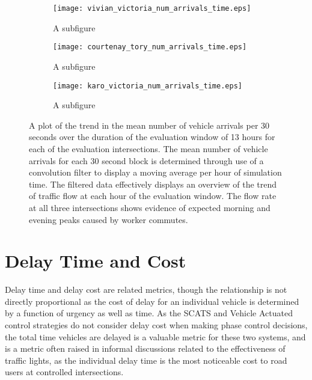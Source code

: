 {\begin{figure}
\centering
\begin{subfigure}{.5\textwidth}
  \centering
  \texttt{[image: vivian\_victoria\_num\_arrivals\_time.eps]}
  \caption{A subfigure}
  \label{vehiclearrivalstime:sub1}
\end{subfigure}%
\begin{subfigure}{.5\textwidth}
  \centering
  \texttt{[image: courtenay\_tory\_num\_arrivals\_time.eps]}
  \caption{A subfigure}
  \label{vehiclearrivalstime:sub2}
\end{subfigure}

\vspace{1cm}

\begin{subfigure}{.5\textwidth}
  \centering
  \texttt{[image: karo\_victoria\_num\_arrivals\_time.eps]}
  \caption{A subfigure}
  \label{vehiclearrivalstime:sub3}
\end{subfigure}%
\caption{ A plot of the trend in the mean number of vehicle arrivals per 30 seconds over the duration of the evaluation window of 13 hours for each of the evaluation intersections. The mean number of vehicle arrivals for each 30 second block is determined through use of a convolution filter to display a moving average per hour of simulation time. The filtered data effectively displays an overview of the trend of traffic flow at each hour of the evaluation window. The flow rate at all three intersections shows evidence of expected morning and evening peaks caused by worker commutes. }
\label{eval:vehiclearrivalstime}
\end{figure}

\section {Delay Time and Cost}
\label{sec:incurred_delay_cost}

Delay time and delay cost are related metrics, though the relationship is not directly proportional as the cost of delay for an individual vehicle is determined by a function of urgency as well as time. As the SCATS and Vehicle Actuated control strategies do not consider delay cost when making phase control decisions, the total time vehicles are delayed is a valuable metric for these two systems, and is a metric often raised in informal discussions related to the effectiveness of traffic lights, as the individual delay time is the most noticeable cost to road users at controlled intersections.

}
